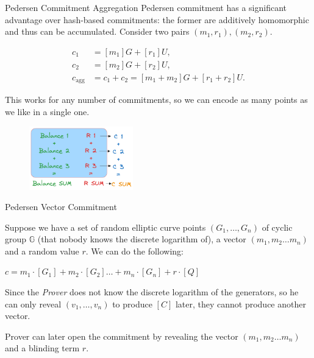 \documentclass{zkdl-presentation-template}
\begin{document}
    \begin{frame}{Pedersen Commitment Aggregation}
        Pedersen commitment has a significant advantage over hash-based commitments:
        the former are additively homomorphic and thus can be accumulated. Consider two pairs $(m_1, r_1), (m_2, r_2)$.
        
        \vspace{-25pt}
        \begin{align*}
            c_1 &=[m_1]G + [r_1]U, \\
            c_2 &= [m_2]G + [r_2]U, \\
            c_{\text{agg}} &= c_1 + c_2 = [m_1 + m_2]G + [r_1 + r_2]U.
        \end{align*}
        \vspace{-25pt}

        This works for any number of commitments, so we can encode as many points as we like in a single one.

        \begin{figure}
            \centering
            \includegraphics[width=0.4\textwidth]{images/lecture_5/Balances.png}
        \end{figure}
        
\end{frame}

    \begin{frame}{Pedersen Vector Commitment}

        Suppose we have a set of random elliptic curve points $(G_1, \ldots ,G_n)$ of cyclic group $\mathbb{G}$ 
    (that nobody knows the discrete logarithm of), a vector $(m_1, m_2 \ldots m_n)$ and a random value $r$. We can do the following:

    \begin{center}
        $ c = m_1\cdot[G_1] + m_2 \cdot [G_2] \ldots + m_n \cdot [G_n] + r \cdot [Q]$ 
    \end{center}

    Since the \textit{Prover} does not know the discrete logarithm of the generators, so he can only reveal $(v_1, \ldots ,v_n)$ to produce $[C]$ later, they cannot produce another vector.

    Prover can later open the commitment by revealing the vector $(m_1, m_2 \ldots m_n)$ and a blinding term $r$.

            
    \end{frame}
\end{document}
